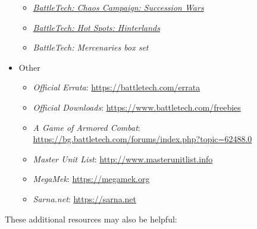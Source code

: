 \begin{itemize}
\begin{itemize}
    \item \emph{\href{https://store.catalystgamelabs.com/products/battletech-chaos-campaign-succession-wars}{BattleTech: Chaos Campaign: Succession Wars}}

    \item \emph{\href{https://store.catalystgamelabs.com/products/battletech-hot-spots-hinterlands}{BattleTech: Hot Spots: Hinterlands}}

    \item \emph{BattleTech: Mercenaries box set}

  \end{itemize}

  \item Other

  \begin{itemize}

    \item \emph{Official Errata}: \href{https://battletech.com/errata}{https://battletech.com/errata}

    \item \emph{Official Downloads}: \href{https://www.battletech.com/freebies}{https://www.battletech.com/freebies}

    \item \emph{A Game of Armored Combat}: \href{https://bg.battletech.com/forums/index.php?topic=62488.0}{https://bg.battletech.com/forums/index.php?topic=62488.0}

    \item \emph{Master Unit List}: \href{http://www.masterunitlist.info}{http://www.masterunitlist.info}

    \item \emph{MegaMek}: \href{https://megamek.org}{https://megamek.org}

    \item \emph{Sarna.net}: \href{https://sarna.net}{https://sarna.net}

  \end{itemize}

\end{itemize}

These additional resources may also be helpful:

